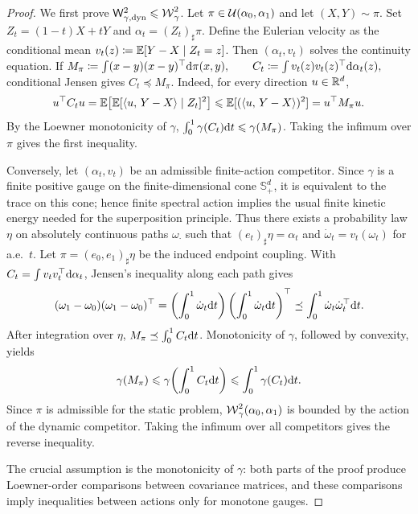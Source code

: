 \begin{proof}
We first prove $\mathsf W_{\gamma,\mathrm{dyn}}^2\leqslant\operatorname{\mathcal{W}}_\gamma^2$. Let $\pi\in\mathcal{U}(\alpha_0,\alpha_1)$ and let $(X,Y)\sim\pi$. Set $Z_t=(1-t)X+tY$ and $\alpha_t=(Z_t)_\sharp\pi$. Define the Eulerian velocity as the conditional mean
\(v_t(z)\coloneqq \mathbb{E}[Y-X\mid Z_t=z]\).
Then $(\alpha_t,v_t)$ solves the continuity equation. If
\(M_\pi\coloneqq\int(x-y)(x-y)^\top\mathrm{d}\pi(x,y), \qquad C_t\coloneqq\int v_t(z)v_t(z)^\top\mathrm{d}\alpha_t(z),\)
conditional Jensen gives \(C_t\preceq M_\pi\). Indeed, for every direction \(u\in\mathbb{R}^d\),
\[
u^\top C_tu
=
\mathbb{E}\!\left[\mathbb{E}[\langle u,\,Y-X\rangle\mid Z_t]^2\right]
\leqslant
\mathbb{E}[(\langle u,\,Y-X\rangle)^2]
=
u^\top M_\pi u.
\]
By the Loewner monotonicity of $\gamma$,
\(\int_0^1\gamma(C_t)\mathrm{d} t \leqslant \gamma(M_\pi)\).
Taking the infimum over $\pi$ gives the first inequality.

Conversely, let $(\alpha_t,v_t)$ be an admissible finite-action competitor. Since $\gamma$ is a finite positive gauge on the finite-dimensional cone $\mathbb S_+^d$, it is equivalent to the trace on this cone; hence finite spectral action implies the usual finite kinetic energy needed for the superposition principle. Thus there exists a probability law $\eta$ on absolutely continuous paths $\omega_\cdot$ such that $(e_t)_\sharp\eta=\alpha_t$ and $\dot\omega_t=v_t(\omega_t)$ for a.e.\ \(t\). Let $\pi=(e_0,e_1)_\sharp\eta$ be the induced endpoint coupling. With \(C_t=\int v_tv_t^\top\mathrm{d}\alpha_t\), Jensen's inequality along each path gives
\[
(\omega_1-\omega_0)(\omega_1-\omega_0)^\top
=
\left(\int_0^1\dot\omega_t\mathrm{d} t\right)
\left(\int_0^1\dot\omega_t\mathrm{d} t\right)^\top
\preceq
\int_0^1\dot\omega_t\dot\omega_t^\top\mathrm{d} t.
\]
After integration over $\eta$,
\(M_\pi\preceq \int_0^1 C_t\mathrm{d} t\).
Monotonicity of $\gamma$, followed by convexity, yields
\[
\gamma(M_\pi)
\leqslant
\gamma\!\left(\int_0^1 C_t\mathrm{d} t\right)
\leqslant
\int_0^1\gamma(C_t)\mathrm{d} t.
\]
Since $\pi$ is admissible for the static problem, $\operatorname{\mathcal{W}}_\gamma^2(\alpha_0,\alpha_1)$ is bounded by the action of the dynamic competitor. Taking the infimum over all competitors gives the reverse inequality.

The crucial assumption is the monotonicity of $\gamma$: both parts of the proof produce Loewner-order comparisons between covariance matrices, and these comparisons imply inequalities between actions only for monotone gauges.
\end{proof}
